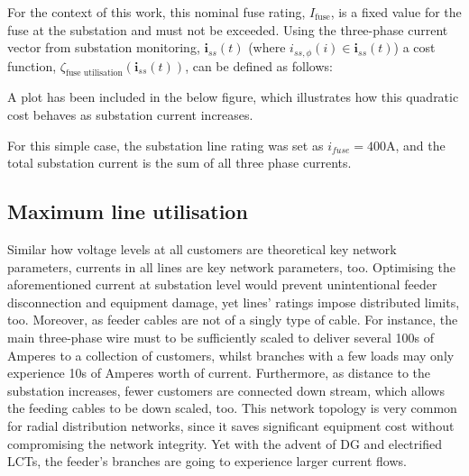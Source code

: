
For the context of this work, this nominal fuse rating, $I_\text{fuse}$, is a fixed value for the fuse at the substation and must not be exceeded.
Using the three-phase current vector from substation monitoring, $\textbf{i}_{ss}(t)$ (where $i_{ss,\phi}(i) \in \textbf{i}_{ss}(t)$) a cost function, $\zeta_\text{fuse utilisation}(\textbf{i}_{ss}(t))$, can be defined as follows:



A plot has been included in the below figure, which illustrates how this quadratic cost behaves as substation current increases.



For this simple case, the substation line rating was set as $i_{fuse}=400\text{A}$, and the total substation current is the sum of all three phase currents.

\subsection{Maximum line utilisation}
\label{ch1:subsec:maximum-line-utilisation}

Similar how voltage levels at all customers are theoretical key network parameters, currents in all lines are key network parameters, too.
Optimising the aforementioned current at substation level would prevent unintentional feeder disconnection and equipment damage, yet lines' ratings impose distributed limits, too.
Moreover, as feeder cables are not of a singly type of cable.
For instance, the main three-phase wire must to be sufficiently scaled to deliver several 100s of Amperes to a collection of customers, whilst branches with a few loads may only experience 10s of Amperes worth of current.
Furthermore, as distance to the substation increases, fewer customers are connected down stream, which allows the feeding cables to be down scaled, too.
This network topology is very common for radial distribution networks, since it saves significant equipment cost without compromising the network integrity.
Yet with the advent of DG and electrified LCTs, the feeder's branches are going to experience larger current flows.


